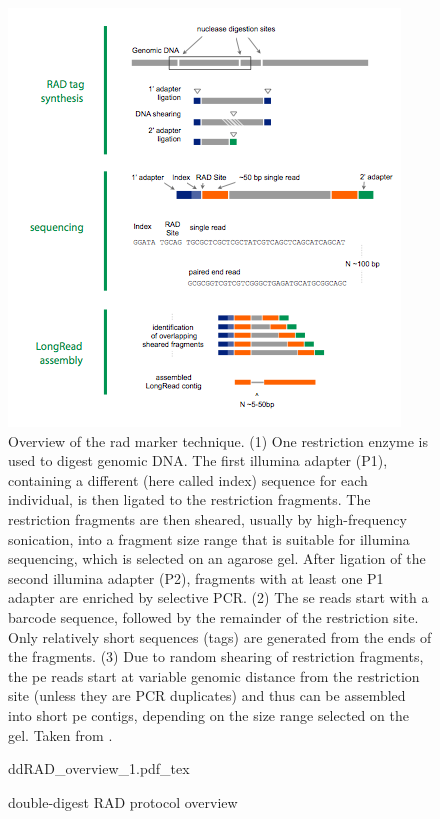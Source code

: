 \documentclass[a4paper,12pt,times,print,index, custombib]{PhDThesisPSnPDF}\usepackage[]{graphicx}\usepackage[]{color}
\begin{document}
\begin{figure}
\centering
\includegraphics[width=.7\textwidth]{RADprotocolOverview}
\caption{Overview of the \gls{rad} marker technique. (1) One restriction enzyme is used to digest genomic DNA. The first illumina adapter (P1), containing a different  (here called index) sequence for each individual, is then ligated to the restriction fragments. The restriction fragments are then sheared, usually by high-frequency sonication, into a fragment size range that is suitable for illumina sequencing, which is selected on an agarose gel. After ligation of the second illumina adapter (P2), fragments with at least one P1 adapter are enriched by selective PCR. (2) The \gls{se} reads start with a barcode sequence, followed by the remainder of the restriction site. Only relatively short sequences (tags) are generated from the ends of the fragments. (3) Due to random shearing of restriction fragments, the \gls{pe} reads start at variable genomic distance from the restriction site (unless they are PCR duplicates) and thus can be assembled into short \gls{pe} contigs, depending on the size range selected on the gel. Taken from \cite{Atwood2011}. }
\label{RAD_protocol_overview}
\end{figure}

\begin{figure}
\def\svgwidth{\textwidth}
{ddRAD_overview_1.pdf_tex}
\caption{double-digest RAD protocol overview}
\label{ddRAD_protocol_overview}
\end{figure}
\end{document}
